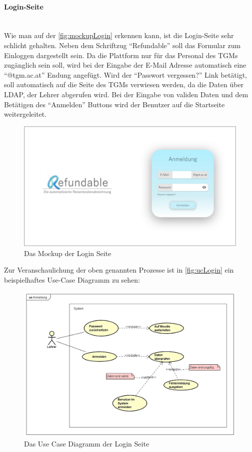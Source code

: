 \paragraph{Login-Seite}
~\\
Wie man auf der \autoref{fig:mockupLogin} erkennen kann, ist die Login-Seite sehr schlicht gehalten. Neben dem Schriftzug \enquote{Refundable} soll das Formular zum Einloggen dargestellt sein. Da die Plattform nur für das Personal des TGMs zugänglich sein soll, wird bei der Eingabe der E-Mail Adresse automatisch eine \enquote{@tgm.ac.at} Endung angefügt. Wird der \enquote{Passwort vergessen?} Link betätigt, soll automatisch auf die Seite des TGMs verwiesen werden, da die Daten über LDAP, der Lehrer abgerufen wird. Bei der Eingabe von validen Daten und dem Betätigen des \enquote{Anmelden} Buttons wird der Benutzer auf die Startseite weitergeleitet.
\begin{figure}[H]
	\centering
	\includegraphics[width=1\linewidth]{images/ldehner_konzept/Mockup-Startseite}
	\caption[Mockup Login]{Das Mockup der Login Seite}
	\label{fig:mockupLogin}
\end{figure}
Zur Veranschaulichung der oben genannten Prozesse ist in \autoref{fig:ucLogin} ein beispielhaftes Use-Case Diagramm zu sehen: 
\begin{figure}[H]
	\centering
	\includegraphics[width=1\linewidth]{images/ldehner_konzept/uc-login}
	\caption[Use Case Diagramm Login]{Das Use Case Diagramm der Login Seite}
	\label{fig:ucLogin}
\end{figure}
\newpage
